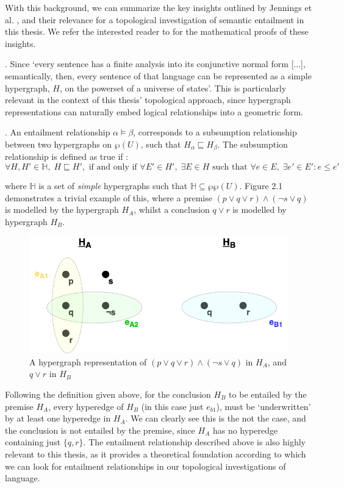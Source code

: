 \documentclass[12pt,twoside]{report}
\begin{document}
With this background, we can summarize the key insights outlined by Jennings et al. \cite{leibnizianAnalysis}, and their relevance for a topological investigation of semantic entailment in this thesis. We refer the interested reader to \cite{leibnizianAnalysis} for the mathematical proofs of these insights. \newline \par {}. Since `every sentence has a finite analysis into its conjunctive normal form [...], semantically, then, every sentence of that language can be represented as a simple hypergraph, $H$, on the powerset of a universe of states'. This is particularly relevant in the context of this thesis' topological approach, since hypergraph representations can naturally embed logical relationships into a geometric form. \newline \par {}. An entailment relationship $\alpha \models \beta$, corresponds to a subsumption relationship between two hypergraphs on $\wp(U)$, such that $H_{\alpha} \sqsubseteq H_{\beta}$. The subsumption relationship is defined as true if \cite{leibnizianAnalysis}: 
$$
\forall H, H' \in \mathbb{H},\; H \sqsubseteq H',
\text{ if and only if }
\forall E' \in H',\; \exists E \in H \text{ such that } 
\forall e \in E,\; \exists e' \in E' : e \leq e'  
$$ 

where $\mathbb{H}$ is a set of \textit{simple} hypergraphs such that $\mathbb{H} \subseteq \wp\wp(U)$. Figure 2.1 demonstrates a trivial example of this, where a premise $(p \lor q \lor r) \land (\neg s \lor q) $  is modelled by the hypergraph $H_A$, whilst a conclusion $q \lor r$ is modelled by hypergraph $H_B$.

\begin{figure}[H]
\centering
\includegraphics[width = 0.5\hsize]{./figures/HypergraphIntro.drawio.png}
\caption{A hypergraph representation of $(p \lor q \lor r) \land (\neg s \lor q)$ in $H_A$, and $q \lor r$ in $H_B$}
\label{fig:Hypergraphs}
\end{figure}

Following the definition given above, for the conclusion $H_B$ to be entailed by the premise $H_A$, every hyperedge of $H_B$ (in this case just $e_{b1}$), must be `underwritten' by at least one hyperedge in $H_A$. We can clearly see this is the not the case, and the conclusion is not entailed by the premise, since $H_A$ has no hyperedge containing just $\{q, r\}$. The entailment relationship described above is also highly relevant to this thesis, as it provides a theoretical foundation according to which we can look for entailment relationships in our topological investigations of language. \newline \par
\end{document}
